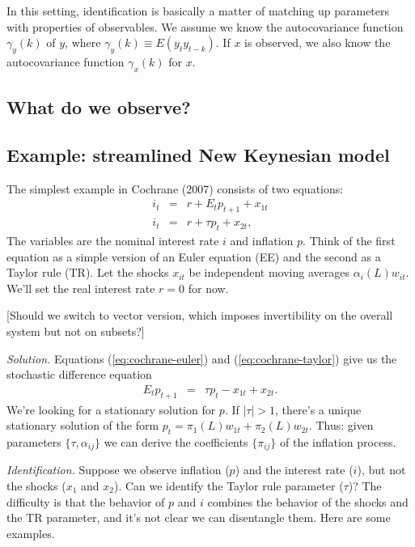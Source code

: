 \documentclass[11pt]{article}
\begin{document}
{In this setting, identification is basically a matter of
matching up parameters with properties of observables.
We assume we know the autocovariance function $\gamma_y(k)$ of $y$,
where $\gamma_y(k) \equiv E (y_t y_{t-k}) $.
If $x$ is observed, we also know the autocovariance  function
$\gamma_x(k)$ for $x$.

\subsection{What do we observe?}


\subsection{Example:  streamlined New Keynesian model}

The simplest example in Cochrane (2007) consists of two equations:
\begin{eqnarray}
    i_t &=& r + E_t p_{t+1} + x_{1t}
        \label{eq:cochrane-euler} \\
    i_t &=& r + \tau p_t + x_{2t} ,
        \label{eq:cochrane-taylor}
\end{eqnarray}
The variables are the nominal interest rate $i$ and inflation $p$.
Think of the first equation as a simple version of an Euler equation (EE)
and the second as a Taylor rule (TR).
Let the shocks $x_{it}$ be independent moving averages $\alpha_i(L)w_{it}$.
We'll set the real interest rate $r = 0 $ for now.

[Should we switch to vector version, which imposes invertibility on the
overall system but not on subsets?]

{\it Solution.}
Equations (\ref{eq:cochrane-euler}) and (\ref{eq:cochrane-taylor})
give us the stochastic difference equation
\begin{eqnarray}
    E_t p_{t+1} &=& \tau p_t - x_{1t} + x_{2t} .
        \label{eq:cochrane-diff}
\end{eqnarray}
We're looking for a stationary solution for $p$.
If $|\tau |>1 $, there's a unique stationary solution of the form
$ p_t = \pi_1(L) w_{1t} + \pi_2(L) w_{2t}$.
Thus:  given parameters $\{ \tau,\alpha_{ij} \}$ we
can derive the coefficients $\{ \pi_{ij} \}$ of the inflation process.

{\it Identification.}
Suppose we observe inflation ($p$) and the interest rate ($i$),
but not the shocks ($x_1$ and $x_2$).
Can we identify the Taylor rule parameter ($\tau$)?
The difficulty is that the behavior of $p$ and $i$ combines
the behavior of the shocks and the TR parameter,
and it's not clear we can disentangle them.
Here are some examples.

}
\end{document}
